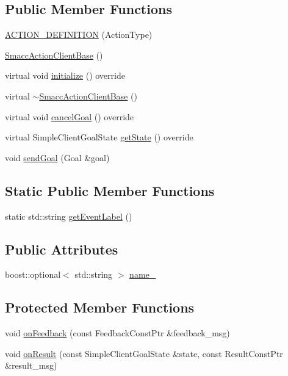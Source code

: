 \subsection*{Public Member Functions}
\begin{DoxyCompactItemize}
\item 
\hyperlink{classsmacc_1_1SmaccActionClientBase_ae244f5d079873d3563da832c4b430523}{A\+C\+T\+I\+O\+N\+\_\+\+D\+E\+F\+I\+N\+I\+T\+I\+ON} (Action\+Type)
\item 
\hyperlink{classsmacc_1_1SmaccActionClientBase_a1c3fa6bf380750b16f2ded87dd60860f}{Smacc\+Action\+Client\+Base} ()
\item 
virtual void \hyperlink{classsmacc_1_1SmaccActionClientBase_a717b234a3e26ea778cce7635fb924e59}{initialize} () override
\item 
virtual \hyperlink{classsmacc_1_1SmaccActionClientBase_a97241a2fa0bcbc6029f2749175623582}{$\sim$\+Smacc\+Action\+Client\+Base} ()
\item 
virtual void \hyperlink{classsmacc_1_1SmaccActionClientBase_a3d5f2229c16bb64a41bf05087fe8a0c0}{cancel\+Goal} () override
\item 
virtual Simple\+Client\+Goal\+State \hyperlink{classsmacc_1_1SmaccActionClientBase_a8d38923b01df38b46099e8ba06f7ff7c}{get\+State} () override
\item 
void \hyperlink{classsmacc_1_1SmaccActionClientBase_a2ec9e5fb96ecc517a815cda209eb1b51}{send\+Goal} (Goal \&goal)
\end{DoxyCompactItemize}
\subsection*{Static Public Member Functions}
\begin{DoxyCompactItemize}
\item 
static std\+::string \hyperlink{classsmacc_1_1SmaccActionClientBase_a3f925bb2c5cfe0dc7937ad7da755209a}{get\+Event\+Label} ()
\end{DoxyCompactItemize}
\subsection*{Public Attributes}
\begin{DoxyCompactItemize}
\item 
boost\+::optional$<$ std\+::string $>$ \hyperlink{classsmacc_1_1SmaccActionClientBase_a7fa0e4b63069bea12d47a83bd0be73d7}{name\+\_\+}
\end{DoxyCompactItemize}
\subsection*{Protected Member Functions}
\begin{DoxyCompactItemize}
\item 
void \hyperlink{classsmacc_1_1SmaccActionClientBase_ab65d16595371809927fdffe8c20c9bd0}{on\+Feedback} (const Feedback\+Const\+Ptr \&feedback\+\_\+msg)
\item 
void \hyperlink{classsmacc_1_1SmaccActionClientBase_ab04cd1fa7f5417df74c28e44cfdc15c5}{on\+Result} (const Simple\+Client\+Goal\+State \&state, const Result\+Const\+Ptr \&result\+\_\+msg)
\end{DoxyCompactItemize}
